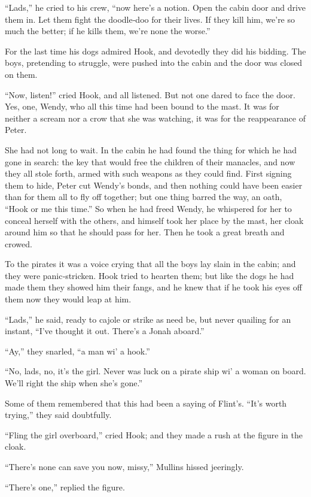 “Lads,” he cried to his crew, “now here’s a notion.
Open the cabin door and drive them in.
Let them fight the doodle‐doo for their lives.
If they kill him, we’re so much the better;
if he kills them, we’re none the worse.”

For the last time his dogs admired Hook,
and devotedly they did his bidding.
The boys, pretending to struggle,
were pushed into the cabin and the door was closed on them.

“Now, listen!\@” cried Hook, and all listened.
But not one dared to face the door.
Yes, one, Wendy, who all this time had been bound to the mast.
It was for neither a scream nor a crow that she was watching,
it was for the reappearance of Peter.

She had not long to wait.
In the cabin he had found the thing for which he had gone in search:
the key that would free the children of their manacles,
and now they all stole forth, armed with such weapons as they could find.
First signing them to hide, Peter cut Wendy’s bonds,
and then nothing could have been easier than for them all to fly off together;
but one thing barred the way, an oath, “Hook or me this time.”
So when he had freed Wendy, he whispered for her to conceal herself with the others,
and himself took her place by the mast, her cloak around him so that he should pass for her.
Then he took a great breath and crowed.

To the pirates it was a voice crying that all the boys lay slain in the cabin;
and they were panic‐stricken.
Hook tried to hearten them;
but like the dogs he had made them they showed him their fangs,
and he knew that if he took his eyes off them now they would leap at him.

“Lads,” he said, ready to cajole or strike as need be,
but never quailing for an instant, “I’ve thought it out.
There’s a Jonah aboard.”

“Ay,” they snarled, “a man wi’ a hook.”

“No, lads, no, it’s the girl.
Never was luck on a pirate ship wi’ a woman on board.
We’ll right the ship when she’s gone.”

Some of them remembered that this had been a saying of Flint’s.
“It’s worth trying,” they said doubtfully.

“Fling the girl overboard,” cried Hook;
and they made a rush at the figure in the cloak.

“There’s none can save you now, missy,” Mullins hissed jeeringly.

“There’s one,” replied the figure.

